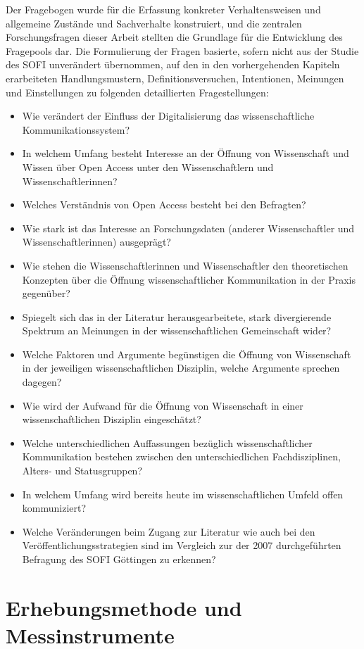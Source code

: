 Der Fragebogen wurde für die Erfassung konkreter Verhaltensweisen und allgemeine Zustände und Sachverhalte \cite{Raab-Steiner_2012} konstruiert, und die zentralen Forschungsfragen dieser Arbeit stellten die Grundlage für die Entwicklung des Fragepools dar. Die Formulierung der Fragen basierte, sofern nicht aus der Studie des SOFI unverändert übernommen, auf den in den vorhergehenden Kapiteln erarbeiteten Handlungsmustern, Definitionsversuchen, Intentionen, Meinungen und Einstellungen zu folgenden detaillierten Fragestellungen:
\begin{itemize}
\item Wie verändert der Einfluss der Digitalisierung das wissenschaftliche Kommunikationssystem?
\item In welchem Umfang besteht Interesse an der Öffnung von Wissenschaft und Wissen über Open Access unter den Wissenschaftlern und Wissenschaftlerinnen?
\item Welches Verständnis von Open Access besteht bei den Befragten?
\item Wie stark ist das Interesse an Forschungsdaten (anderer Wissenschaftler und Wissenschaftlerinnen) ausgeprägt?
\item Wie stehen die Wissenschaftlerinnen und Wissenschaftler den theoretischen Konzepten über die Öffnung wissenschaftlicher Kommunikation in der Praxis gegenüber?
\item Spiegelt sich das in der Literatur herausgearbeitete, stark divergierende Spektrum an Meinungen in der wissenschaftlichen Gemeinschaft wider?
\item Welche Faktoren und Argumente begünstigen die Öffnung von Wissenschaft in der jeweiligen wissenschaftlichen Disziplin, welche Argumente sprechen dagegen?
\item Wie wird der Aufwand für die Öffnung von Wissenschaft in einer wissenschaftlichen Disziplin eingeschätzt?
\item Welche unterschiedlichen Auffassungen bezüglich wissenschaftlicher Kommunikation bestehen zwischen den unterschiedlichen Fachdisziplinen, Alters- und Statusgruppen?
\item In welchem Umfang wird bereits heute im wissenschaftlichen Umfeld offen kommuniziert?
\item Welche Veränderungen beim Zugang zur Literatur wie auch bei den Veröffentlichungsstrategien sind im Vergleich zur der 2007 durchgeführten Befragung des SOFI Göttingen zu erkennen?
\end{itemize}

\section{Erhebungsmethode und Messinstrumente}

